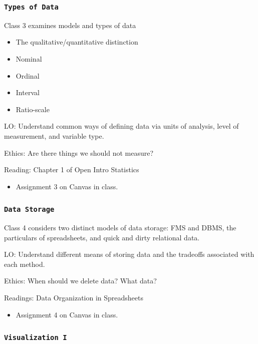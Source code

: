 \documentclass[11pt,]{article}
\begin{document}
\subsubsection{\texorpdfstring{\texttt{Types\ of\ Data}}{Types of Data}}\label{types-of-data}

Class 3 examines models and types of data

\begin{itemize}
\item
  The qualitative/quantitative distinction
\item
  Nominal
\item
  Ordinal
\item
  Interval
\item
  Ratio-scale
\end{itemize}

LO: Understand common ways of defining data via units of analysis, level
of measurement, and variable type.

Ethics: Are there things we should not measure?

Reading: Chapter 1 of Open Intro Statistics

\begin{itemize}
\item Assignment 3 on Canvas in class.
\end{itemize}

\subsubsection{\texorpdfstring{\texttt{Data\ Storage}}{Data Storage}}\label{data-storage}

Class 4 considers two distinct models of data storage: FMS and DBMS, the
particulars of spreadsheets, and quick and dirty relational data.

LO: Understand different means of storing data and the tradeoffs
associated with each method.

Ethics: When should we delete data? What data?

Readings: Data Organization in Spreadsheets

\begin{itemize}
\item Assignment 4 on Canvas in class.
\end{itemize}

\subsubsection{\texorpdfstring{\texttt{Visualization\ I}}{Visualization I}}\label{visualization-i}
\end{document}
